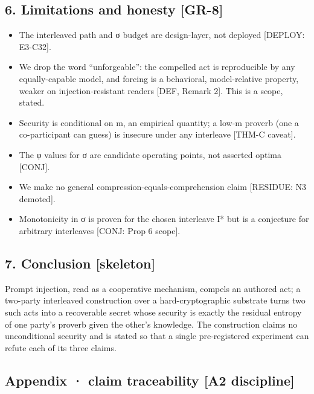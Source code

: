 \documentclass[
  11pt,
]{article}
\providecommand{\tightlist}{%
  \setlength{\itemsep}{0pt}\setlength{\parskip}{0pt}}
\begin{document}
\subsection{6. Limitations and honesty
{[}GR-8{]}}\label{limitations-and-honesty-gr-8}

\begin{itemize}
\tightlist
\item
  The interleaved path and σ budget are design-layer, not deployed
  {[}DEPLOY: E3-C32{]}.
\item
  We drop the word ``unforgeable'': the compelled act is reproducible by
  any equally-capable model, and forcing is a behavioral, model-relative
  property, weaker on injection-resistant readers {[}DEF, Remark 2{]}.
  This is a scope, stated.
\item
  Security is conditional on m, an empirical quantity; a low-m proverb
  (one a co-participant can guess) is insecure under any interleave
  {[}THM-C caveat{]}.
\item
  The φ values for σ are candidate operating points, not asserted optima
  {[}CONJ{]}.
\item
  We make no general compression-equals-comprehension claim {[}RESIDUE:
  N3 demoted{]}.
\item
  Monotonicity in σ is proven for the chosen interleave I* but is a
  conjecture for arbitrary interleaves {[}CONJ: Prop 6 scope{]}.
\end{itemize}

\subsection{7. Conclusion {[}skeleton{]}}\label{conclusion-skeleton}

Prompt injection, read as a cooperative mechanism, compels an authored
act; a two-party interleaved construction over a hard-cryptographic
substrate turns two such acts into a recoverable secret whose security
is exactly the residual entropy of one party's proverb given the other's
knowledge. The construction claims no unconditional security and is
stated so that a single pre-registered experiment can refute each of its
three claims.

\subsection{Appendix · claim traceability {[}A2
discipline{]}}\label{appendix-claim-traceability-a2-discipline}
\end{document}
